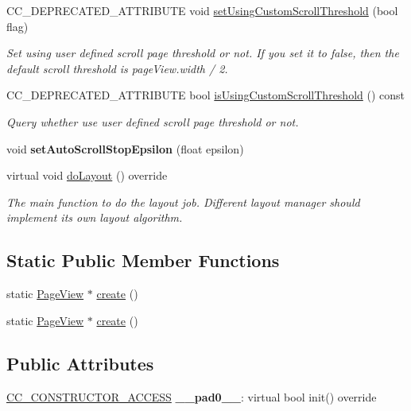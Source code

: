\begin{DoxyCompactItemize}
C\+C\+\_\+\+D\+E\+P\+R\+E\+C\+A\+T\+E\+D\+\_\+\+A\+T\+T\+R\+I\+B\+U\+TE void \hyperlink{classui_1_1PageView_ae173b8839db817ed5aa09a910b8169aa}{set\+Using\+Custom\+Scroll\+Threshold} (bool flag)
\begin{DoxyCompactList}\small\item\em Set using user defined scroll page threshold or not. If you set it to false, then the default scroll threshold is page\+View.\+width / 2. \end{DoxyCompactList}\item 
C\+C\+\_\+\+D\+E\+P\+R\+E\+C\+A\+T\+E\+D\+\_\+\+A\+T\+T\+R\+I\+B\+U\+TE bool \hyperlink{classui_1_1PageView_ae867b3f9b2753cfc5851440d9b36f90e}{is\+Using\+Custom\+Scroll\+Threshold} () const
\begin{DoxyCompactList}\small\item\em Query whether use user defined scroll page threshold or not. \end{DoxyCompactList}\item 
\mbox{\label{classui_1_1PageView_a174b4b1a791416501a9ce513209e4799}} 
void {\bfseries set\+Auto\+Scroll\+Stop\+Epsilon} (float epsilon)
\item 
\mbox{\label{classui_1_1PageView_a75e1306f56bf22b39a05f4c71aa03991}} 
virtual void \hyperlink{classui_1_1PageView_a75e1306f56bf22b39a05f4c71aa03991}{do\+Layout} () override
\begin{DoxyCompactList}\small\item\em The main function to do the layout job. Different layout manager should implement its own layout algorithm. \end{DoxyCompactList}\end{DoxyCompactItemize}
\subsection*{Static Public Member Functions}
\begin{DoxyCompactItemize}
\item 
static \hyperlink{classui_1_1PageView}{Page\+View} $\ast$ \hyperlink{classui_1_1PageView_ac47ee4c872601f7a31dcab63965f7164}{create} ()
\item 
static \hyperlink{classui_1_1PageView}{Page\+View} $\ast$ \hyperlink{classui_1_1PageView_ac874e906c816faf0f6e640d98345191b}{create} ()
\end{DoxyCompactItemize}
\subsection*{Public Attributes}
\begin{DoxyCompactItemize}
\item 
\mbox{\label{classui_1_1PageView_a39727d614804b97de07e645b6e4042a1}} 
\hyperlink{_2cocos2d_2cocos_2base_2ccConfig_8h_a25ef1314f97c35a2ed3d029b0ead6da0}{C\+C\+\_\+\+C\+O\+N\+S\+T\+R\+U\+C\+T\+O\+R\+\_\+\+A\+C\+C\+E\+SS} {\bfseries \+\_\+\+\_\+pad0\+\_\+\+\_\+}\+: virtual bool init() override
\end{DoxyCompactItemize}
